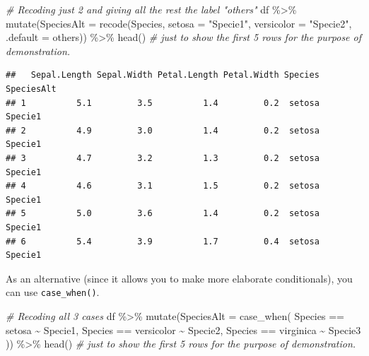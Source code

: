 \documentclass[
]{book}
\newenvironment{Shaded}{\begin{snugshade}}{\end{snugshade}}
\newcommand{\AttributeTok}[1]{\textcolor[rgb]{0.77,0.63,0.00}{#1}}
\newcommand{\CommentTok}[1]{\textcolor[rgb]{0.56,0.35,0.01}{\textit{#1}}}
\newcommand{\FunctionTok}[1]{\textcolor[rgb]{0.00,0.00,0.00}{#1}}
\newcommand{\NormalTok}[1]{#1}
\newcommand{\SpecialCharTok}[1]{\textcolor[rgb]{0.00,0.00,0.00}{#1}}
\newcommand{\StringTok}[1]{\textcolor[rgb]{0.31,0.60,0.02}{#1}}
\begin{document}
\begin{Shaded}
\begin{Highlighting}[]
\CommentTok{\# Recoding just 2 and giving all the rest the label "others"}
\NormalTok{df }\SpecialCharTok{\%\textgreater{}\%} 
  \FunctionTok{mutate}\NormalTok{(}\AttributeTok{SpeciesAlt =} \FunctionTok{recode}\NormalTok{(Species, }\AttributeTok{setosa =} \StringTok{"Specie1"}\NormalTok{,}
                             \AttributeTok{versicolor =} \StringTok{"Specie2"}\NormalTok{, }\AttributeTok{.default =} \StringTok{\textquotesingle{}others\textquotesingle{}}\NormalTok{)) }\SpecialCharTok{\%\textgreater{}\%} 
  \FunctionTok{head}\NormalTok{()  }\CommentTok{\# just to show the first 5 rows for the purpose of demonstration.}
\end{Highlighting}
\end{Shaded}

\begin{verbatim}
##   Sepal.Length Sepal.Width Petal.Length Petal.Width Species SpeciesAlt
## 1          5.1         3.5          1.4         0.2  setosa    Specie1
## 2          4.9         3.0          1.4         0.2  setosa    Specie1
## 3          4.7         3.2          1.3         0.2  setosa    Specie1
## 4          4.6         3.1          1.5         0.2  setosa    Specie1
## 5          5.0         3.6          1.4         0.2  setosa    Specie1
## 6          5.4         3.9          1.7         0.4  setosa    Specie1
\end{verbatim}

As an alternative (since it allows you to make more elaborate conditionals), you can use \texttt{case\_when()}.

\begin{Shaded}
\begin{Highlighting}[]
\CommentTok{\# Recoding all 3 cases}
\NormalTok{df }\SpecialCharTok{\%\textgreater{}\%} 
  \FunctionTok{mutate}\NormalTok{(}\AttributeTok{SpeciesAlt =} \FunctionTok{case\_when}\NormalTok{(}
\NormalTok{    Species }\SpecialCharTok{==} \StringTok{\textquotesingle{}setosa\textquotesingle{}} \SpecialCharTok{\textasciitilde{}} \StringTok{\textquotesingle{}Specie1\textquotesingle{}}\NormalTok{,}
\NormalTok{    Species }\SpecialCharTok{==} \StringTok{\textquotesingle{}versicolor\textquotesingle{}} \SpecialCharTok{\textasciitilde{}} \StringTok{\textquotesingle{}Specie2\textquotesingle{}}\NormalTok{,}
\NormalTok{    Species }\SpecialCharTok{==} \StringTok{\textquotesingle{}virginica\textquotesingle{}} \SpecialCharTok{\textasciitilde{}} \StringTok{\textquotesingle{}Specie3\textquotesingle{}}
\NormalTok{  )) }\SpecialCharTok{\%\textgreater{}\%} 
  \FunctionTok{head}\NormalTok{()  }\CommentTok{\# just to show the first 5 rows for the purpose of demonstration.}
\end{Highlighting}
\end{Shaded}
\end{document}
